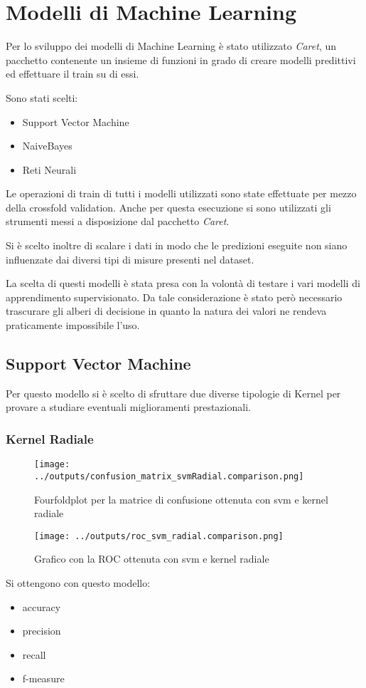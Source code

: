 \chapter{Modelli di Machine Learning}
Per lo sviluppo dei modelli di Machine Learning è stato utilizzato
\textit{Caret}, un pacchetto contenente un insieme di funzioni in grado di 
creare modelli predittivi ed effettuare il train su di essi.

Sono stati scelti:
\begin{itemize}
    \item Support Vector Machine
    \item NaiveBayes
    \item Reti Neurali
\end{itemize}

Le operazioni di train di tutti i modelli utilizzati sono state effettuate 
per mezzo della crossfold validation. Anche per questa esecuzione si sono utilizzati 
gli strumenti messi a disposizione dal pacchetto \textit{Caret}.

Si è scelto inoltre di scalare i dati in modo che le predizioni eseguite non siano 
influenzate dai diversi tipi di misure presenti nel dataset.

La scelta di questi modelli è stata presa con la volontà di testare i vari
modelli di apprendimento supervisionato.
Da tale considerazione è stato però necessario trascurare gli alberi di 
decisione in quanto la natura dei valori ne rendeva praticamente impossibile 
l'uso.

\section{Support Vector Machine}
Per questo modello si è scelto di sfruttare due diverse tipologie di Kernel
per provare a studiare eventuali miglioramenti prestazionali. 
\subsection{Kernel Radiale}

\begin{figure}[H]
    \centering
    \texttt{[image: ../outputs/confusion\_matrix\_svmRadial.comparison.png]}
    \caption{Fourfoldplot per la matrice di confusione ottenuta con svm e kernel radiale}
\end{figure}
\begin{figure}[H]
    \centering
    \texttt{[image: ../outputs/roc\_svm\_radial.comparison.png]}
    \caption{Grafico con la ROC ottenuta con svm e kernel radiale}
\end{figure}
Si ottengono con questo modello:
\begin{itemize}
    \item accuracy
    \item precision
    \item recall
    \item f-measure
\end{itemize}


